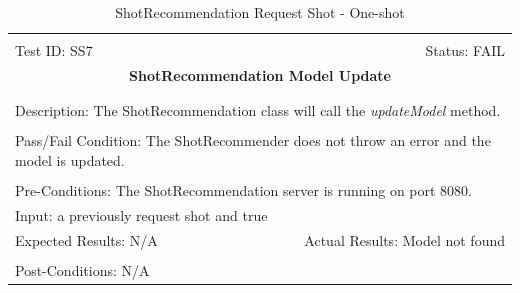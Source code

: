 \documentclass[11pt]{article}
\begin{document}
\begin{center}
\begin{table}[H]
\begin{tabular}{|l r|}\hline&\\[-2mm]
	Test ID: SS7	&Status: FAIL\\[-3mm]
	\multicolumn{2}{|c|}{\textbf{\large{ShotRecommendation Model Update}}}\\&\\\hline&\\[-3mm]
	\multicolumn{2}{|p{\textwidth}|}{Description: The ShotRecommendation class will call the \textit{updateModel} method.}\\[1mm]\hline&\\[-3mm]
	\multicolumn{2}{|p{\textwidth}|}{Pass/Fail Condition: The ShotRecommender does not throw an error and the model is updated.}\\[1mm]\hline&\\[-3mm]
	\multicolumn{2}{|p{\textwidth}|}{Pre-Conditions: The ShotRecommendation server is running on port 8080.}\\[4mm]
	\multicolumn{2}{|p{\textwidth}|}{Input: a previously request shot and true}\\[2mm]\hline
	\multicolumn{1}{|p{0.49\textwidth}}{Expected Results: N/A}	&\multicolumn{1}{|p{0.45\textwidth}|}{Actual Results: Model not found}\\\hline&\\[-3mm]
	\multicolumn{2}{|p{\textwidth}|}{Post-Conditions: N/A}\\\hline
\end{tabular}
\caption{ShotRecommendation Request Shot - One-shot}
\end{table}
\end{center}
\end{document}
